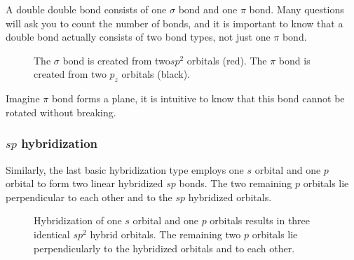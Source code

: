 \documentclass{report}
\begin{document}
				A double double bond consists of one $\sigma$ bond and one $\pi$ bond. Many questions will ask you to count the number of bonds, and it is important to know that a double bond actually consists of two bond types, not just one $\pi$ bond.
			\begin{figure}[H]
			\centering
			\captionsetup{justification=centering, margin=2cm}
			\vspace{8mm}
			\setbondoffset{0pt}
			\vspace{7mm}
			\caption{The $\sigma$ bond is created from two$sp^2$ orbitals (red). The $\pi$ bond is created from two $p_z$ orbitals (black).}
			\end{figure}
			
				Imagine $\pi$ bond forms a plane, it is intuitive to know that this bond cannot be rotated without breaking.
			
			\subsubsection{$sp$ hybridization}
				Similarly, the last basic hybridization type employs one $s$ orbital and one $p$ orbital to form two linear hybridized $sp$ bonds. The two remaining $p$ orbitals lie perpendicular to each other and to the $sp$ hybridized orbitals.
				
				\begin{figure}[H]
				\centering
				\captionsetup{justification=centering, margin=2cm}
			\vspace{5mm}
				\setbondoffset{0pt}
				 \hfill
				\ch{->[Hybridization]} \hfill
			\vspace{5mm}
				\setbondoffset{0pt}
				 \vspace{5mm}
			\caption{Hybridization of one $s$ orbital and one $p$ orbitals results in three identical $sp^2$ hybrid orbitals. The remaining two $p$ orbitals lie perpendicularly to the hybridized orbitals and to each other.}
				\end{figure}
				
\end{document}
